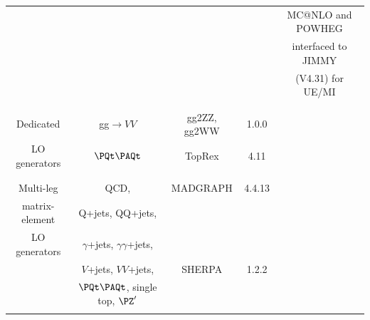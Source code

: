 \begin{table}[t]
\begin{center}
{\begin{tabular}{|c|c|c|c|c|}
                       &                                       &                       &                      & MC@NLO and POWHEG          \\  
                       &                                       &                       &                      & interfaced to JIMMY  \\ 
                      &                                       &                       &                      &   (V4.31) for UE/MI                     \\  
                     &                          &                       &                      &                       \\     
\hline %
                     &                          &                       &                      &                       \\   
Dedicated  	     &  gg$\to VV$                     &  gg2ZZ,   gg2WW  &   1.0.0 &                  \\  
LO  generators       &          $\PQt\PAQt$                &   TopRex     &       4.11   &                       \\   
                     &                          &                       &                      &                       \\   
\hline %
                     &                          &                       &                      &                       \\    
 Multi-leg         & QCD,                    &  MADGRAPH  &  4.4.13        &        \\  
  matrix-element  & Q+jets, QQ+jets,       &                        &                 &                               \\  
 LO  generators    & $\gamma$+jets, $\gamma\gamma$+jets, &   &           &                              \\  
                       &  $V$+jets, $VV$+jets, &     SHERPA        &   1.2.2          &   \\        
                       & $\PQt\PAQt$, single top, $\PZ'$  &                       &                      &                       \\  
                       &                                       &                       &                      &                       \\  

\end{tabular}}
\end{center}
\end{table}

